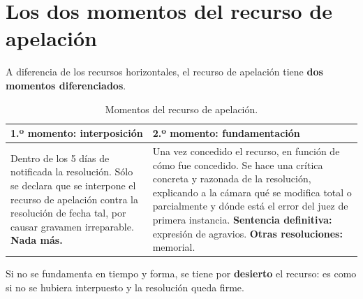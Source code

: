 \documentclass[12pt,oneside]{book}
\begin{document}
\section{Los dos momentos del recurso de apelaci\'on}

A diferencia de los recursos horizontales, el recurso de apelaci\'on tiene \textbf{dos momentos diferenciados}.

\begin{table}[H]
\centering
\begin{tabularx}{\textwidth}{
    >{\raggedright\arraybackslash}X
    >{\raggedright\arraybackslash}X
}
\toprule
\textbf{1.º momento: interposici\'on} & \textbf{2.º momento: fundamentaci\'on} \\
\midrule
Dentro de los 5 d\'ias de notificada la resoluci\'on. S\'olo se declara que se interpone el recurso de apelaci\'on contra la resoluci\'on de fecha tal, por causar gravamen irreparable. \textbf{Nada m\'as.} &
Una vez concedido el recurso, en funci\'on de c\'omo fue concedido. Se hace una cr\'itica concreta y razonada de la resoluci\'on, explicando a la c\'amara qu\'e se modifica total o parcialmente y d\'onde est\'a el error del juez de primera instancia. \newline
\textbf{Sentencia definitiva:} expresi\'on de agravios. \newline
\textbf{Otras resoluciones:} memorial. \\
\bottomrule
\end{tabularx}
\caption{Momentos del recurso de apelaci\'on.}
\end{table}

\begin{important}
Si no se fundamenta en tiempo y forma, se tiene por \textbf{desierto} el recurso: es como si no se hubiera interpuesto y la resoluci\'on queda firme.
\end{important}
\end{document}
